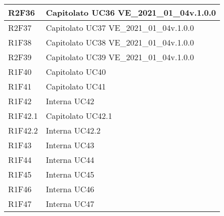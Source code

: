 \begin{center}
\begin{longtable}{|p{22mm}|p{44mm}|}
		R2F36 &
		Capitolato \newline
		UC36 \newline
		VE\_2021\_01\_04v.1.0.0 
		\\
		\hline
		
		R2F37 &
		Capitolato \newline
		UC37 \newline
		VE\_2021\_01\_04v.1.0.0 
		\\
		\hline
		
		R1F38 &
		Capitolato \newline
		UC38 \newline
		VE\_2021\_01\_04v.1.0.0 
		\\
		\hline
		
		R2F39 &
		Capitolato \newline
		UC39 \newline
		VE\_2021\_01\_04v.1.0.0 
		\\
		\hline
		
		
		R1F40 &
		Capitolato \newline
		UC40 
		\\
		\hline
		
		R1F41 &
		Capitolato \newline
		UC41 
		\\
		\hline
		
		R1F42 &
		Interna \newline
		UC42 
		\\
		\hline
		
		R1F42.1 &
		Capitolato \newline
		UC42.1 
		\\
		\hline
		
		R1F42.2 &
		Interna \newline
		UC42.2 
		\\
		\hline
		
		R1F43 &
		Interna \newline
		UC43 
		\\
		\hline
		
		R1F44 &
		Interna \newline
		UC44 
		\\
		\hline
		
		R1F45 &
		Interna \newline
		UC45 
		\\
		\hline
		
		R1F46 &
		Interna \newline
		UC46 
		\\
		\hline
		
		R1F47 &
		Interna \newline
		UC47 
		\\
		\hline
		

\end{longtable}
\end{center}
